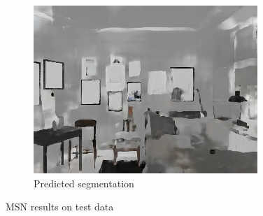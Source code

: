 \begin{figure}[H]
\begin{subfigure}{0.32\linewidth}
        \includegraphics[width=\linewidth]{praca/images/AI45_003_Cam01.predicted_segmentation.png}
        \caption{Predicted segmentation}
    \end{subfigure}
    \caption[MSN results - test data]{MSN results on test data}
    \label{fig:msn-test}
\end{figure}